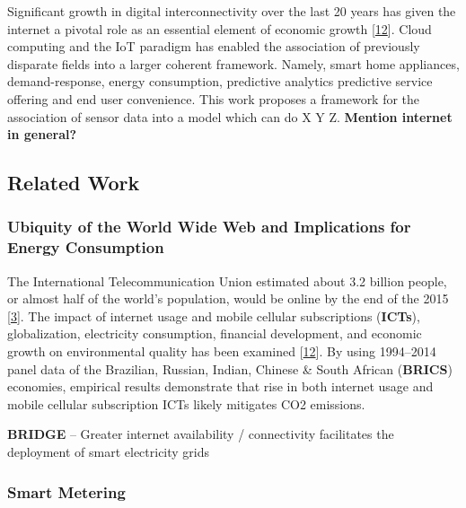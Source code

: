 \documentclass[11pt,]{article}
\begin{document}
Significant growth in digital interconnectivity over the last 20 years
has given the internet a pivotal role as an essential element of
economic growth
{[}\protect\hyperlink{ref-haseebDoesInformationCommunication2019}{12}{]}.
Cloud computing and the IoT paradigm has enabled the association of
previously disparate fields into a larger coherent framework. Namely,
smart home appliances, demand-response, energy consumption, predictive
analytics predictive service offering and end user convenience. This
work proposes a framework for the association of sensor data into a
model which can do X Y Z. \textbf{Mention internet in general?}

\hypertarget{related-work}{%
\subsection{Related Work}\label{related-work}}

\hypertarget{ubiquity-of-the-world-wide-web-and-implications-for-energy-consumption}{%
\subsubsection{Ubiquity of the World Wide Web and Implications for
Energy
Consumption}\label{ubiquity-of-the-world-wide-web-and-implications-for-energy-consumption}}

The International Telecommunication Union estimated about 3.2 billion
people, or almost half of the world's population, would be online by the
end of the 2015
{[}\protect\hyperlink{ref-InformationCommunicationTechnologies}{3}{]}.
The impact of internet usage and mobile cellular subscriptions
(\textbf{ICTs}), globalization, electricity consumption, financial
development, and economic growth on environmental quality has been
examined
{[}\protect\hyperlink{ref-haseebDoesInformationCommunication2019}{12}{]}.
By using 1994--2014 panel data of the Brazilian, Russian, Indian,
Chinese \& South African (\textbf{BRICS}) economies, empirical results
demonstrate that rise in both internet usage and mobile cellular
subscription ICTs likely mitigates CO2 emissions.

\textbf{BRIDGE} -- Greater internet availability / connectivity
facilitates the deployment of smart electricity grids

\hypertarget{smart-metering}{%
\subsubsection{Smart Metering}\label{smart-metering}}
\end{document}
